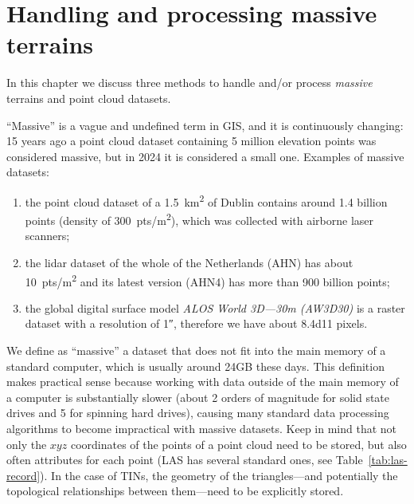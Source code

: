 
\setchapterpreamble[u]{\margintoc}

\chapter{Handling and processing massive terrains}%
\label{chap:massive}


\graphicspath{{massive/}}


In this chapter we discuss three methods to handle and/or process \emph{massive} terrains and point cloud datasets.

%

``Massive'' is a vague and undefined term in GIS, and it is continuously changing: 15 years ago a point cloud dataset containing 5 million elevation points was considered massive, but in 2024 it is considered a small one.%
Examples of massive datasets: 
\begin{enumerate}
  \item the point cloud dataset of a \qty{1.5}{km^2} of Dublin contains around 1.4 billion points (density of \qty{300}{pts/m^2}), which was collected with airborne laser scanners; 
  \item the lidar dataset of the whole of the Netherlands (AHN) has about \qty{10}{pts/m^2} and its latest version (AHN4) has more than 900 billion points;
  \item the global digital surface model \emph{ALOS World 3D---30m (AW3D30)} is a raster dataset with a resolution of \ang{;;1}, therefore we have about \num{8.4d11} pixels.
\end{enumerate}

%

We define as ``massive'' a dataset that does not fit into the main memory of a standard computer, which is usually around 24GB these days.
This definition makes practical sense because working with data outside of the main memory of a computer is substantially slower (about 2 orders of magnitude for solid state drives and 5 for spinning hard drives), causing many standard data processing algorithms to become impractical with massive datasets.
Keep in mind that not only the $xyz$ coordinates of the points of a point cloud need to be stored, but also often attributes for each point (LAS has several standard ones, see Table~\ref{tab:las-record}).
In the case of TINs, the geometry of the triangles---and potentially the topological relationships between them---need to be explicitly stored.

